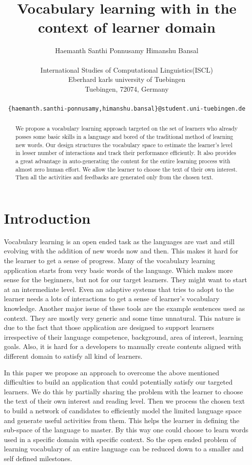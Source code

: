 \documentclass[11pt,a4paper]{article}
\title{Vocabulary learning with in the context of learner domain}
\author{Haemanth Santhi Ponnusamy \qquad Himanshu Bansal \\\\
  International Studies of Computational Linguistics(ISCL) \\
  Eberhard karls university of Tuebingen\\
  Tuebingen, 72074, Germany \\\\ \tt \small \{haemanth.santhi-ponnusamy,himanshu.bansal\}@student.uni-tuebingen.de}
\date{}
\begin{document}
\maketitle
\begin{abstract}
  We propose a vocabulary learning approach targeted on the set of learners
  who already posses some basic skills in a language and bored of the
  traditional method of learning new words. Our design 
  structures the vocabulary space to estimate the learner's
  level in lesser number of interactions and track their performance efficiently.
  It also provides a great advantage in auto-generating the content
  for the entire learning process with almost zero human effort. We allow the
  learner to choose the text of their own interest. Then all the activities and
  feedbacks are generated only from the chosen text.
\end{abstract}

\section{Introduction}
Vocabulary learning is an open ended task as the languages are vast and still
evolving with the addition of new words now and then. This makes it hard for the
learner to get a sense of progress. Many of the vocabulary learning application 
starts from very basic words of the language. Which makes more sense for the 
beginners, but not for our target learners. They might want to start at an intermediate level.
Even an adaptive systems that tries to adopt to the learner needs a lots of interactions
to get a sense of learner's vocabulary knowledge. Another major issue of these tools are the
example sentences used as context. They are mostly very generic and some time unnatural.
This nature is due to the fact that those application are designed to support learners irrespective of their
language competence, background, area of interest, learning goals. Also, it is
hard for a developers to manually create contents aligned with different domain to satisfy all kind of learners.

In this paper we propose an approach to overcome the above mentioned
difficulties to build an application that could potentially satisfy our targeted
learners. We do this by partially sharing the problem with the learner to choose the 
text of their own interest and reading level. Then we process the chosen text to
build a network of candidates to efficiently model the limited language space and
generate useful activities from them. This helps
the learner in defining the sub-space of the language to master. By this way one
could choose to learn words used in a specific domain with specific context.
So the open ended problem of learning vocabulary of an entire language can be reduced
down to a smaller and self defined milestones.
\end{document}
